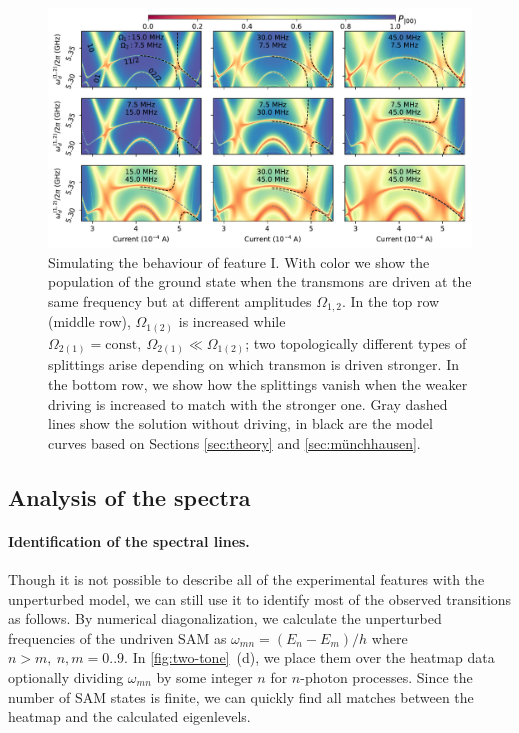 \documentclass[%
 aps, prx,
 amsmath,amssymb,
 reprint,%
superscriptaddress
]{revtex4-2}
\begin{document}
\begin{figure}
	\centering
	\includegraphics[width=\linewidth]{topological_splittings}
	\caption{Simulating the behaviour of feature I. With color we show the population of the ground 
	state when the transmons are driven at the 
	same frequency but at different amplitudes 
	$\Omega_{1,2}$. In the top row (middle row), 
	$\Omega_{1(2)}$ is increased while 
	$\Omega_{2(1)} = \text{const},\ \Omega_{2(1)} \ll 
	\Omega_{1(2)}$; two topologically different 
	types of splittings arise depending on 
	which transmon is driven stronger. In the 
	bottom row, we show how the splittings vanish 
	when the weaker driving is increased to match 
	with the stronger one. Gray dashed lines show 
	the solution without driving, in black are 
	the model curves based on Sections 
	\ref{sec:theory} and \ref{sec:münchhausen}.}
	\label{fig:difdrive}
\end{figure}


\subsection{Analysis of the spectra} 
\label{sec:analysis}

\paragraph{Identification of the spectral lines.} 
Though it is not possible to describe all of the 
experimental features with the unperturbed model, 
we can still use it to identify most of the 
observed transitions as follows. By numerical diagonalization, we calculate the 
unperturbed frequencies of the undriven SAM as 
$\omega_{mn} = (E_n - E_m)/h$ where $n>m,\  
n,m=0..9$. In \autoref{fig:two-tone}~(d), we 
place them over the heatmap data optionally dividing 
$\omega_{mn}$ by some integer $n$ for $n$-photon processes. 
Since the number of SAM states is finite, we can 
quickly find all matches between the heatmap and the calculated eigenlevels. 
\end{document}
